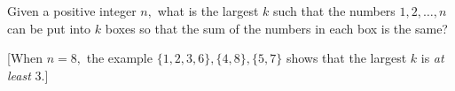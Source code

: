 Given a positive integer $n,$ what is the largest $k$ such that the numbers $1,2,\dots,n$ can be put into $k$ boxes so that the sum of the numbers in each box is the same?

[When $n=8,$ the example $\{1,2,3,6\},\{4,8\},\{5,7\}$ shows that the largest $k$ is \textit{at least} 3.]